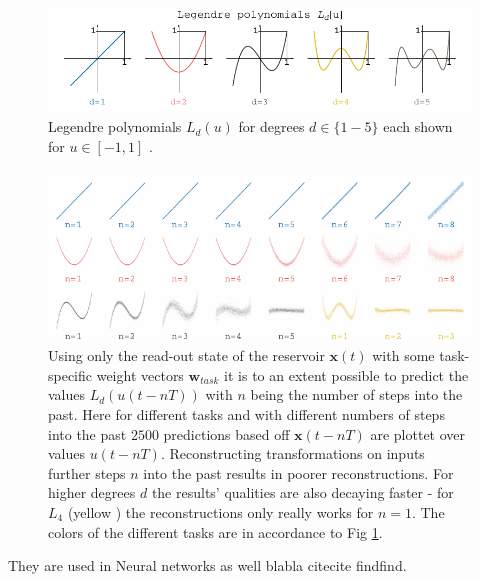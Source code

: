 \begin{figure}
	\centering
	\includegraphics[width=0.99\linewidth]{pics/legendre_degrees}
	\caption{Legendre polynomials $L_{d}(u)$ for degrees $d \in \{1-5\}$ each shown for $u \in [-1,1]$ .}
	\label{fig:legendreDegrees}
\end{figure}

\begin{figure}\label{fig:legendre_transformation_predictions}
	\centering
	\includegraphics[width=15cm]{pics/predictions_pure_legendre}
	\caption{Using only the read-out state of the reservoir $\mathbf{x}(t)$ with some task-specific weight vectors $\mathbf{w}_{task}$ it is to an extent possible to predict the values $L_d(u(t-n T))$ with $n$ being the number of steps into the past. Here for different tasks and with different numbers of steps into the past $2500$ predictions based off $\mathbf{x}(t-nT)$ are plottet over values $u(t-n T)$. Reconstructing transformations on inputs further steps $n$ into the past results in poorer reconstructions. For higher degrees $d$ the results' qualities are also decaying faster - for $L_4$ (yellow	) the reconstructions only really works for $n=1$. The colors  of the different tasks are in accordance to Fig \ref{fig:legendreDegrees}.}
\end{figure}




They are used in Neural networks as well blabla citecite findfind. 



